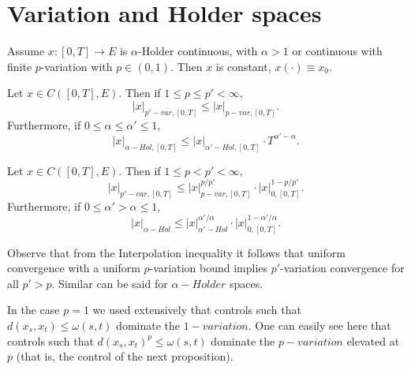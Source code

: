 \section{Variation and Holder spaces}

\begin{proposition}
    Assume $x: [0,T] \rightarrow E$ is $\alpha$-Holder continuous, with $\alpha > 1$ or continuous with finite $p$-variation with $p \in (0, 1).$
    Then $x$ is constant, $x(\cdot) \equiv x_0.$
\end{proposition}

\begin{proposition}
    Let $x \in C([0,T], E)$. Then if $1 \leq p \leq p' < \infty,$
    \begin{equation}
        |x|_{p'-var, [0,T]} \leq |x|_{p-var, [0,T]}. 
    \end{equation} 
    Furthermore, if $0 \leq \alpha \leq \alpha' \leq 1,$
    \begin{equation}
        |x|_{\alpha-Hol,[0,T]} \leq |x|_{\alpha'-Hol,[0,T]} \cdot T^{\alpha' - \alpha}.
    \end{equation}
\end{proposition}

\begin{proposition}[Interpolation]
        Let $x \in C([0,T], E)$. Then if $1 \leq p < p' < \infty,$
    \begin{equation}
        |x|_{p'-var, [0,T]} \leq |x|_{p-var, [0,T]}^{p/p'} \cdot |x|_{0,[0,T]}^{1 - p/p'}. 
    \end{equation} 
    Furthermore, if $0 \leq \alpha' > \alpha \leq 1,$
    \begin{equation}
        |x|_{\alpha-Hol} \leq |x|_{\alpha'-Hol}^{\alpha' / \alpha} \cdot |x|_{0,[0,T]}^{1 - \alpha' / \alpha}.
    \end{equation}
\end{proposition}

Observe that from the Interpolation inequality it follows that uniform convergence with a uniform $p$-variation bound implies $p'$-variation convergence for all $p' > p$.
Similar can be said for $\alpha-Holder$ spaces.

\begin{observation}
    In the case $p=1$ we used extensively that controls such that $d(x_s, x_t) \leq \omega(s,t)$ dominate the $1-variation.$ One can easily see here that controls such that $d(x_s, x_t)^p \leq \omega(s,t)$ dominate the $p-variation$ elevated at $p$ (that is, the control of the next proposition).
\end{observation}

